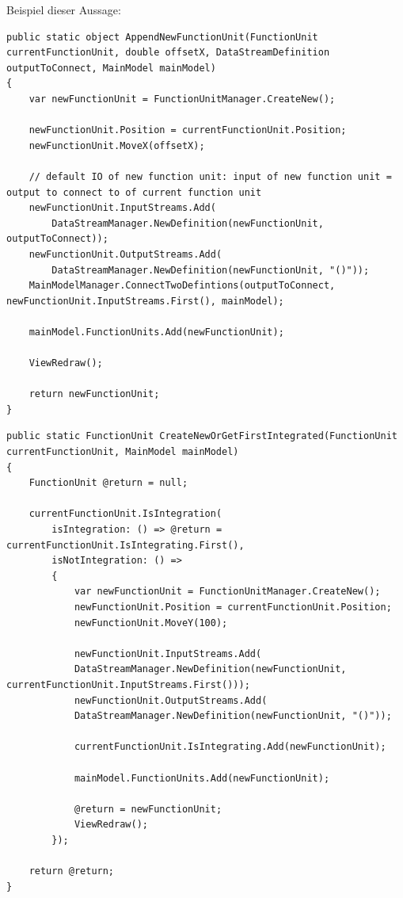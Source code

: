 Beispiel dieser Aussage:
\begin{lstlisting}[caption=AppendNewFunctionUnit]
public static object AppendNewFunctionUnit(FunctionUnit currentFunctionUnit, double offsetX, DataStreamDefinition outputToConnect, MainModel mainModel)
{
	var newFunctionUnit = FunctionUnitManager.CreateNew();
	
	newFunctionUnit.Position = currentFunctionUnit.Position;
	newFunctionUnit.MoveX(offsetX);
	
	// default IO of new function unit: input of new function unit = output to connect to of current function unit
	newFunctionUnit.InputStreams.Add(
		DataStreamManager.NewDefinition(newFunctionUnit, outputToConnect));
	newFunctionUnit.OutputStreams.Add(
		DataStreamManager.NewDefinition(newFunctionUnit, "()"));
	MainModelManager.ConnectTwoDefintions(outputToConnect, newFunctionUnit.InputStreams.First(), mainModel);
	
	mainModel.FunctionUnits.Add(newFunctionUnit);
	
	ViewRedraw();
	
	return newFunctionUnit;
}
\end{lstlisting}

\begin{lstlisting}[caption=CreateNewOrGetFirstIntegrated]
public static FunctionUnit CreateNewOrGetFirstIntegrated(FunctionUnit currentFunctionUnit, MainModel mainModel)
{
	FunctionUnit @return = null;
	
	currentFunctionUnit.IsIntegration(
		isIntegration: () => @return = 		currentFunctionUnit.IsIntegrating.First(),
		isNotIntegration: () =>
		{
			var newFunctionUnit = FunctionUnitManager.CreateNew();
			newFunctionUnit.Position = currentFunctionUnit.Position;
			newFunctionUnit.MoveY(100);
			
			newFunctionUnit.InputStreams.Add(
			DataStreamManager.NewDefinition(newFunctionUnit, currentFunctionUnit.InputStreams.First()));
			newFunctionUnit.OutputStreams.Add(
			DataStreamManager.NewDefinition(newFunctionUnit, "()"));
			
			currentFunctionUnit.IsIntegrating.Add(newFunctionUnit);
			
			mainModel.FunctionUnits.Add(newFunctionUnit);
			
			@return = newFunctionUnit;
			ViewRedraw();
		});
	
	return @return;
}
	\end{lstlisting}





